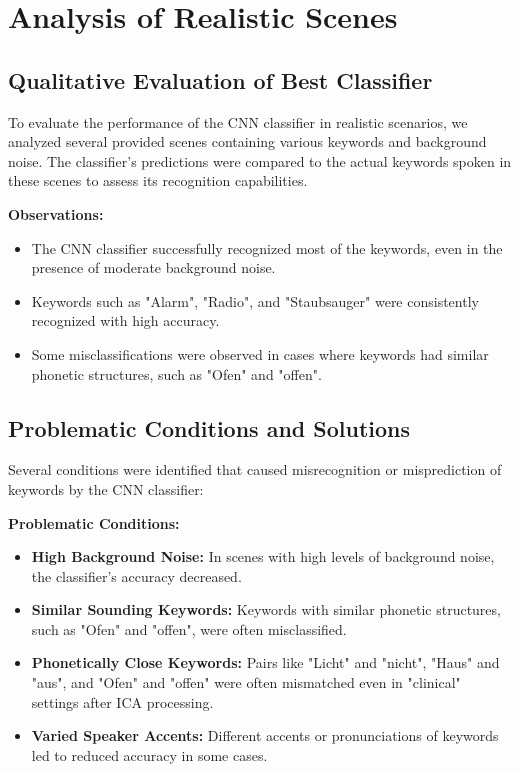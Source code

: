 \section{Analysis of Realistic Scenes}

\subsection{Qualitative Evaluation of Best Classifier}
To evaluate the performance of the CNN classifier in realistic scenarios, we analyzed several provided scenes containing various keywords and background noise. The classifier's predictions were compared to the actual keywords spoken in these scenes to assess its recognition capabilities.

\textbf{Observations:}
\begin{itemize}
    \item The CNN classifier successfully recognized most of the keywords, even in the presence of moderate background noise.
    \item Keywords such as "Alarm", "Radio", and "Staubsauger" were consistently recognized with high accuracy.
    \item Some misclassifications were observed in cases where keywords had similar phonetic structures, such as "Ofen" and "offen".
\end{itemize}

\subsection{Problematic Conditions and Solutions}
Several conditions were identified that caused misrecognition or misprediction of keywords by the CNN classifier:

\textbf{Problematic Conditions:}
\begin{itemize}
    \item \textbf{High Background Noise:} In scenes with high levels of background noise, the classifier's accuracy decreased.
    \item \textbf{Similar Sounding Keywords:} Keywords with similar phonetic structures, such as "Ofen" and "offen", were often misclassified.
    \item \textbf{Phonetically Close Keywords:} Pairs like "Licht" and "nicht", "Haus" and "aus", and "Ofen" and "offen" were often mismatched even in "clinical" settings after ICA processing.
    \item \textbf{Varied Speaker Accents:} Different accents or pronunciations of keywords led to reduced accuracy in some cases.
\end{itemize}

